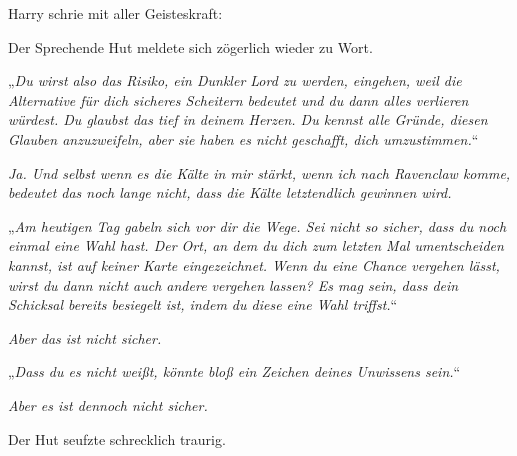 Harry schrie mit aller Geisteskraft: 

Der Sprechende Hut meldete sich zögerlich wieder zu Wort.

„\emph{Du wirst also das Risiko, ein Dunkler Lord zu werden, eingehen, weil die Alternative für dich sicheres Scheitern bedeutet und du dann alles verlieren würdest. Du glaubst das tief in deinem Herzen. Du kennst alle Gründe, diesen Glauben anzuzweifeln, aber sie haben es nicht geschafft, dich umzustimmen.}“

\emph{Ja. Und selbst wenn es die Kälte in mir \emph{stärkt}, wenn ich nach Ravenclaw komme, bedeutet das noch lange nicht, dass die Kälte letztendlich \emph{gewinnen} wird.}

„\emph{Am heutigen Tag gabeln sich vor dir die Wege. Sei nicht so sicher, dass du noch einmal eine Wahl hast. Der Ort, an dem du dich zum \emph{letzten} Mal umentscheiden kannst, ist auf keiner Karte eingezeichnet. Wenn du eine Chance vergehen lässt, wirst du dann nicht auch andere vergehen lassen? Es mag sein, dass dein Schicksal bereits besiegelt ist, indem du diese eine Wahl triffst.}“

\emph{Aber das ist nicht sicher. }

„\emph{Dass \emph{du} es nicht \emph{weißt}, könnte bloß ein Zeichen \emph{deines} Unwissens sein.}“

\emph{Aber es ist dennoch nicht sicher.}

Der Hut seufzte schrecklich traurig.

